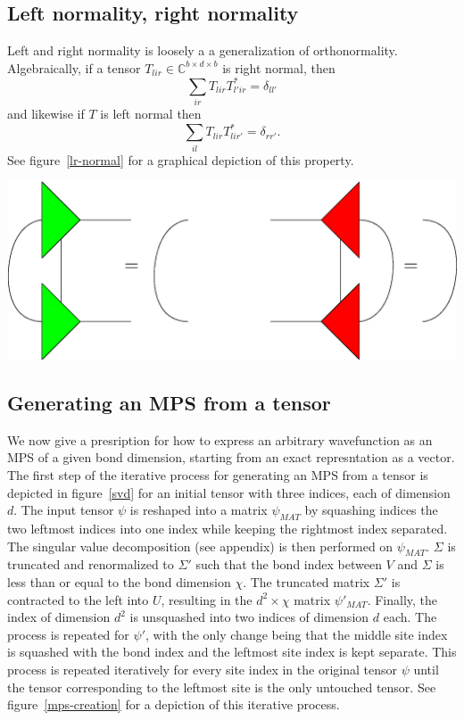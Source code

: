 \documentclass[12pt]{article}
\newenvironment{Figure}
  {\par\medskip\noindent\minipage{\linewidth}}
  {\endminipage\par\medskip}
\begin{document}
\begin{multicols}{2}
	\subsection{Left normality, right normality}
	Left and right normality is loosely a a generalization of
	orthonormality. Algebraically, if a tensor
	$T_{lir}\in\mathds{C}^{b\times d\times b}$
	is right normal, then
	$$\sum_{ir}T_{lir}T^*_{l'ir}=\delta_{ll'}$$
	and likewise if $T$ is left normal then
	$$\sum_{il}T_{lir}T^*_{lir'}=\delta_{rr'}.$$
	See figure~\ref{lr-normal} for a graphical depiction of this property.

	\begin{Figure}
		\center\includegraphics[width=.55\textwidth]{./Figures/lr_normal.eps}
		\label{lr-normal}
	\end{Figure}

	\subsection{Generating an MPS from a tensor}
	We now give a presription for how to express an arbitrary wavefunction as an MPS of a given bond dimension, starting from an exact represntation as a vector.
	The first step of the iterative process for generating an MPS from a
	tensor is depicted in figure~\ref{svd} for an initial tensor with
	three indices, each of dimension $d$. The input tensor $\psi$ is
	reshaped into a matrix $\psi_{MAT}$ by squashing indices the two
	leftmost indices into one index while keeping the rightmost index
	separated. The singular value decomposition (see appendix) is then performed on
	$\psi_{MAT}$. $\Sigma$ is truncated and renormalized to $\Sigma'$
	such that the bond index between $V$ and $\Sigma$ is less than or
	equal to the bond dimension $\chi$. The truncated matrix $\Sigma'$
	is contracted to the left into $U$, resulting in the $d^2\times\chi$
	matrix $\psi'_{MAT}$. Finally, the index of dimension $d^2$ is
	unsquashed into two indices of dimension $d$ each. The process is
	repeated for $\psi'$, with the only change being that the middle
	site index is squashed with the bond index and the leftmost site
	index is kept separate. This process is repeated iteratively for
	every site index in the original tensor $\psi$ until the tensor
	corresponding to the leftmost site is the only untouched tensor.
	See figure~\ref{mps-creation} for a depiction of this iterative
	process.


\end{multicols}
\end{document}
